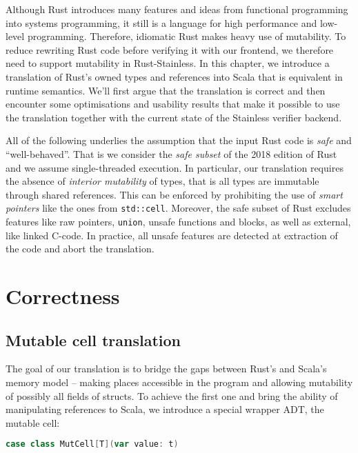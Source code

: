 Although Rust introduces many features and ideas from functional
programming into systems programming, it still is a language for high
performance and low-level programming. Therefore, idiomatic Rust makes
heavy use of mutability. To reduce rewriting Rust code before verifying
it with our frontend, we therefore need to support mutability in
Rust-Stainless. In this chapter, we introduce a translation of Rust's
owned types and references into Scala that is equivalent in runtime
semantics. We'll first argue that the translation is correct and then
encounter some optimisations and usability results that make it possible
to use the translation together with the current state of the Stainless
verifier backend.

All of the following underlies the assumption that the input Rust code
is \emph{safe} and ``well-behaved''. That is we consider the
\emph{safe subset} \cite[section "Unsafety"]{rustref}
of the 2018 edition of Rust and we assume single-threaded
execution. In particular, our translation requires the absence of
\emph{interior mutability} \cite[section "Interior Mutability"]{rustref}
of types, that is all types are immutable through shared
references. This can be enforced by prohibiting the use of \emph{smart
pointers} like the ones from \passthrough{\lstinline!std::cell!}.
Moreover, the safe subset of Rust excludes features like raw pointers,
\passthrough{\lstinline!union!}, unsafe functions and blocks, as well as
external, like linked C-code. In practice, all unsafe features are
detected at extraction of the code and abort the translation.

\section{Correctness}

\subsection{Mutable cell translation}

The goal of our translation is to bridge the gaps between Rust's and
Scala's memory model -- making places accessible in the program and
allowing mutability of possibly all fields of structs. To achieve the
first one and bring the ability of manipulating references to Scala, we
introduce a special wrapper ADT, the mutable cell:

\begin{lstlisting}[language=Scala, style=short]
case class MutCell[T](var value: t)
\end{lstlisting}

